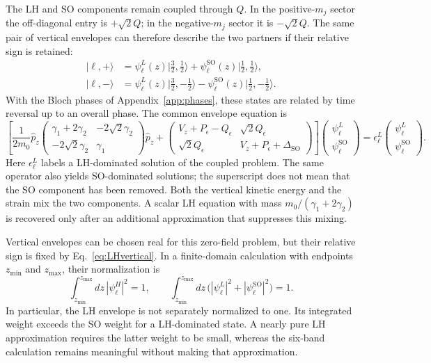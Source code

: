 \documentclass[10pt,letterpaper]{article}
\newcommand{\ket}[1]{\lvert #1\rangle}
\newcommand{\ep}{\epsilon}
\newcommand{\SO}{\mathrm{SO}}
\begin{document}
The LH and SO components remain coupled through $Q$. In the positive-$m_j$ sector the off-diagonal entry is $+\sqrt2Q$; in the negative-$m_j$ sector it is $-\sqrt2Q$. The same pair of vertical envelopes can therefore describe the two partners if their relative sign is retained:
\begin{align}
\ket{\ell,+}&=\psi_\ell^L(z)\ket{\tfrac32,\tfrac12}
+\psi_\ell^{\SO}(z)\ket{\tfrac12,\tfrac12},\nonumber\\
\ket{\ell,-}&=\psi_\ell^L(z)\ket{\tfrac32,-\tfrac12}
-\psi_\ell^{\SO}(z)\ket{\tfrac12,-\tfrac12}.
\label{eq:mixedpartners}
\end{align}
With the Bloch phases of Appendix~\ref{app:phases}, these states are related by time reversal up to an overall phase. The common envelope equation is
\begin{equation}
\left[
\frac{1}{2m_0} \hat{p}_ z
\begin{pmatrix}
\gamma_1+2\gamma_2&-2\sqrt2\gamma_2\\
-2\sqrt2\gamma_2&\gamma_1
\end{pmatrix} \hat{p}_ z
+
\begin{pmatrix}
V_z+P_\ep-Q_\ep&\sqrt2Q_\ep\\
\sqrt2Q_\ep&V_z+P_\ep+\Delta_{\SO}
\end{pmatrix}
\right]
\begin{pmatrix}\psi_\ell^L\\\psi_\ell^{\SO}\end{pmatrix}
=\epsilon_\ell^L
\begin{pmatrix}\psi_\ell^L\\\psi_\ell^{\SO}\end{pmatrix}.
\label{eq:LHvertical}
\end{equation}
Here $\epsilon_\ell^L$ labels a LH-dominated solution of the coupled problem. The same operator also yields SO-dominated solutions; the superscript does not mean that the SO component has been removed. Both the vertical kinetic energy and the strain mix the two components. A scalar LH equation with mass $m_0/(\gamma_1+2\gamma_2)$ is recovered only after an additional approximation that suppresses this mixing.

Vertical envelopes can be chosen real for this zero-field problem, but their relative sign is fixed by Eq.~\eqref{eq:LHvertical}. In a finite-domain calculation with endpoints $z_{\min}$ and $z_{\max}$, their normalization is
\begin{equation}
\int_{z_{\min}}^{z_{\max}}dz\,|\psi_\ell^H|^2=1,
\qquad
\int_{z_{\min}}^{z_{\max}}dz\,
\bigl(|\psi_\ell^L|^2+|\psi_\ell^{\SO}|^2\bigr)=1.
\label{eq:normalization}
\end{equation}
In particular, the LH envelope is not separately normalized to one. Its integrated weight exceeds the SO weight for a LH-dominated state. A nearly pure LH approximation requires the latter weight to be small, whereas the six-band calculation remains meaningful without making that approximation.
\end{document}
